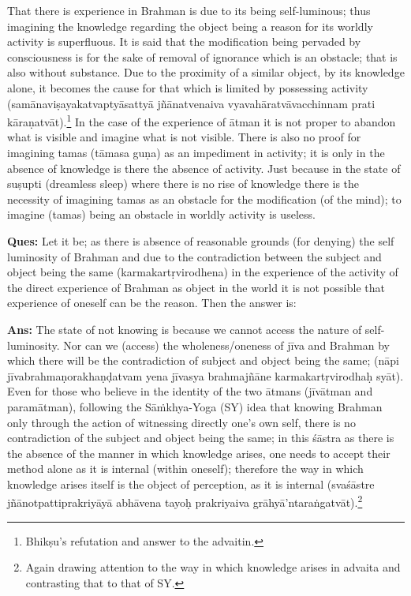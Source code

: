 That there is experience in Brahman is due to its being self-luminous; thus imagining the knowledge regarding the object being a reason for its worldly activity is superfluous. It is said that the modification being pervaded by consciousness   is for the sake of removal of ignorance which is an obstacle; that is also without substance. Due to the proximity of a similar object, by its knowledge alone, it becomes the cause for that which is limited by possessing activity (samānaviṣayakatvaptyāsattyā jñānatvenaiva vyavahāratvāvacchinnam prati kāraṇatvāt).\footnote{Bhikṣu’s refutation and answer to the advaitin.} In the case of the experience of ātman it is not proper to abandon what is visible and imagine what is not visible. There is also no proof for imagining tamas (tāmasa guṇa) as an impediment in activity; it is only in the absence of knowledge is there the absence of activity. Just because in the state of suṣupti (dreamless sleep) where there is no rise of knowledge there is the necessity of imagining tamas as an obstacle for the modification (of the mind); to imagine (tamas) being an obstacle in worldly activity is useless.

\textbf{Ques:} Let it be; as there is absence of reasonable grounds (for denying) the self luminosity of Brahman and due to the contradiction between the subject and object being the same (karmakartṛvirodhena) in the experience of the activity of the direct experience of Brahman as object in the world it is not possible that experience of oneself can be the reason. Then the answer is: 

\textbf{Ans:} The state of not knowing is because we cannot access the nature of self-luminosity. Nor can we (access) the wholeness/oneness of jīva and Brahman by which there will be the contradiction of subject and object being the same;  (nāpi jīvabrahmaṇorakhaṇḍatvam yena jīvasya brahmajñāne karmakartṛvirodhaḥ syāt). Even for those who believe in the identity of the two ātmans (jīvātman and paramātman), following the Sāṁkhya-Yoga (SY) idea that  knowing Brahman only through the action of witnessing directly one’s own self, there is no contradiction of the subject and object being the same; in this śāstra as there is the absence of the manner in which knowledge arises, one needs to accept their method alone as it is internal (within oneself); therefore the way in which knowledge arises itself is the object of perception, as it is internal (svaśāstre jñānotpattiprakriyāyā abhāvena tayoḥ prakriyaiva grāhyā’ntaraṅgatvāt).\footnote{Again drawing attention to the way in which knowledge arises in advaita and contrasting that to that of SY.}

